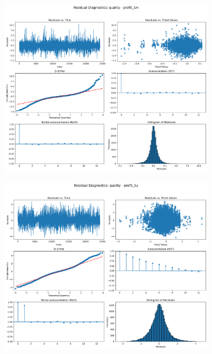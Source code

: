 \documentclass[11pt,english,a4paper,hidelinks]{book}
\begin{document}
\begin{figure}[H]
    \centering
    \begin{subfigure}[b]{0.32\textwidth}
        \centering
        \includegraphics[width=\textwidth]{images/code/models/linear_regression/third_model/EU/quality_profit_1m_residuals.png}
    \end{subfigure}
    \hfill
    \begin{subfigure}[b]{0.32\textwidth}
        \centering
        \includegraphics[width=\textwidth]{images/code/models/linear_regression/third_model/EU/quality_profit_1y_residuals.png}

\end{subfigure}
\end{figure}
\end{document}

